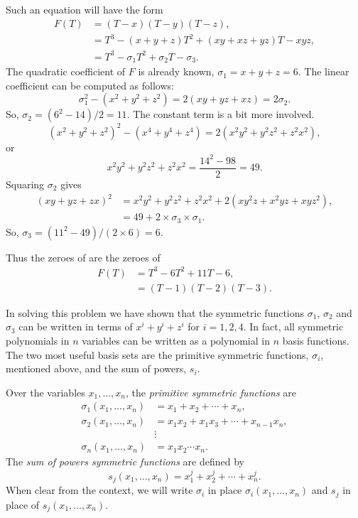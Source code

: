 Such an equation will have the form
\[
\begin{aligned}
F(T) & = (T - x) (T - y) (T - z), \\
  &= T^3 - (x + y + z) T^2 + (xy + xz +yz) T - xyz,\\
  &= T^3 - \sigma_1 T^2 + \sigma_2 T - \sigma_3.
\end{aligned}
\]
The quadratic coefficient of $F$ is already known, $\sigma_1 = x+y+z =
6$.  The linear coefficient can be computed as follows:
\[
\sigma_1^2 -(x^2 + y^2 +z^2) = 2(xy + yz +xz) = 2 \sigma_2.
\]
So, $\sigma_2 = (6^2 - 14)/2 = 11$.  The constant term is a bit more
involved.  
\[
(x^2 + y^2 + z^2)^2 - (x^4 + y^4 + z^4) = 2(x^2 y^2 + y^2 z^2 + z^2x^2),
\]
or
\[
x^2 y^2 + y^2 z^2 + z^2x^2 = \frac{14^2 - 98}{2} = 49.
\]
Squaring $\sigma_2$ gives
\[
\begin{aligned}
(xy + yz +zx)^2 &= x^2 y^2 + y^2 z^2 + z^2 x^2 + 2(xy^2z + x^2 y z + xyz^2),\\
  & = 49 + 2 \times \sigma_3 \times \sigma_1.
\end{aligned}
\]
So, $\sigma_3 = (11^2 - 49)/(2 \times 6) = 6$.

Thus the zeroes of  are the zeroes of 
\[
\begin{aligned}
 F(T) & = T^3 - 6 T^2 + 11 T - 6,\\
      & = (T - 1) (T - 2) (T - 3).
\end{aligned}
\]

In solving this problem we have shown that the symmetric functions
$\sigma_1$, $\sigma_2$ and $\sigma_3$ can be written in terms of $x^i
+ y^i + z^i$ for $i = 1, 2, 4$.  In fact, all symmetric polynomials in
$n$ variables can be written as a polynomial in $n$ basis functions.
The two most useful basis sets are the primitive symmetric functions,
$\sigma_i$, mentioned above, and the sum of powers, $s_i$.

Over the variables $x_1, \ldots, x_n$, the {\em primitive symmetric
functions} are
\[
\begin{aligned}
\sigma_1(x_1, \ldots, x_n) &= x_1 + x_2 + \cdots + x_n, \\
\sigma_2(x_1, \ldots, x_n) &= x_1 x_2 + x_1 x_3 + \cdots + x_{n-1} x_n, \\
  & \vdots \\
\sigma_n(x_1, \ldots, x_n) &= x_1 x_2 \cdots x_n.
\end{aligned}
\]
The {\em sum of powers symmetric functions} are defined by
\[
s_j(x_1, \ldots, x_n) = x_1^j + x_2^j + \cdots + x_n^j.
\]
When clear from the context, we will write $\sigma_i$ in place
$\sigma_i(x_1, \ldots, x_n)$ and $s_j$ in place of $s_j(x_1, \ldots,
x_n)$.

